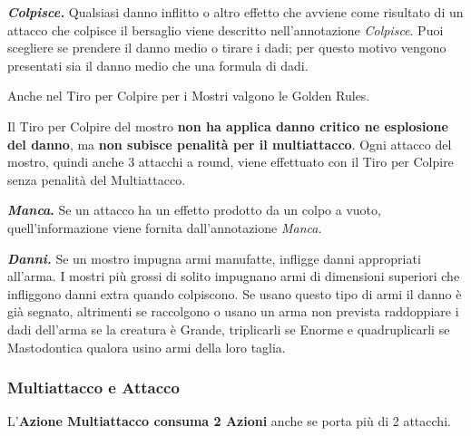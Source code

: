 \begin{multicols}{2}
\emph{\textbf{Colpisce.}} Qualsiasi danno inflitto o altro effetto che avviene come risultato di un attacco che colpisce il bersaglio viene descritto nell'annotazione \emph{Colpisce}. Puoi scegliere se prendere il danno medio o tirare i dadi; per questo motivo vengono presentati sia il danno medio che una formula di dadi.

Anche nel Tiro per Colpire per i Mostri valgono le Golden Rules.

Il Tiro per Colpire del mostro \textbf{non ha applica danno critico ne esplosione del danno}, ma \textbf{non subisce penalità per il multiattacco}. Ogni attacco del mostro, quindi anche 3 attacchi a round, viene effettuato con il Tiro per Colpire senza penalità del Multiattacco.

\textbf{\emph{Manca}.} Se un attacco ha un effetto prodotto da un colpo a vuoto, quell'informazione viene fornita dall'annotazione \emph{Manca}.

\emph{\textbf{Danni.}} Se un mostro impugna armi manufatte, infligge danni appropriati all'arma. I mostri più grossi di solito impugnano armi di dimensioni superiori che infliggono danni extra quando colpiscono. Se usano questo tipo di armi il danno è già segnato, altrimenti se raccolgono o usano un arma non prevista raddoppiare i dadi dell'arma se la creatura è Grande, triplicarli se Enorme e quadruplicarli se Mastodontica qualora usino armi della loro taglia.




\subsubsection{Multiattacco e Attacco}

L'\textbf{Azione Multiattacco consuma 2 Azioni} anche se porta più di 2 attacchi.


\end{multicols}
